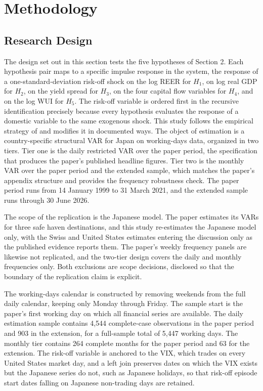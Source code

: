 \section{Methodology}

\subsection{Research Design}

The design set out in this section tests the five hypotheses of Section 2. Each hypothesis pair maps to a specific impulse response in the system, the response of a one-standard-deviation risk-off shock on the log REER for $H_1$, on log real GDP for $H_2$, on the yield spread for $H_3$, on the four capital flow variables for $H_4$, and on the log WUI for $H_5$. The risk-off variable is ordered first in the recursive identification precisely because every hypothesis evaluates the response of a domestic variable to the same exogenous shock. This study follows the empirical strategy of \textcite[Section 4]{beirne_sugandi_2023} and modifies it in documented ways. The object of estimation is a country-specific structural VAR for Japan on working-days data, organized in two tiers. Tier one is the daily restricted VAR over the paper period, the specification that produces the paper's published headline figures. Tier two is the monthly VAR over the paper period and the extended sample, which matches the paper's appendix structure and provides the frequency robustness check. The paper period runs from 14 January 1999 to 31 March 2021, and the extended sample runs through 30 June 2026.

The scope of the replication is the Japanese model. The paper estimates its VARs for three safe haven destinations, and this study re-estimates the Japanese model only, with the Swiss and United States estimates entering the discussion only as the published evidence reports them. The paper's weekly frequency panels are likewise not replicated, and the two-tier design covers the daily and monthly frequencies only. Both exclusions are scope decisions, disclosed so that the boundary of the replication claim is explicit.

The working-days calendar is constructed by removing weekends from the full daily calendar, keeping only Monday through Friday. The sample start is the paper's first working day on which all financial series are available. The daily estimation sample contains 4,544 complete-case observations in the paper period and 903 in the extension, for a full-sample total of 5,447 working days. The monthly tier contains 264 complete months for the paper period and 63 for the extension. The risk-off variable is anchored to the VIX, which trades on every United States market day, and a left join preserves dates on which the VIX exists but the Japanese series do not, such as Japanese holidays, so that risk-off episode start dates falling on Japanese non-trading days are retained.

